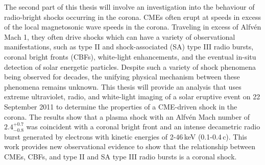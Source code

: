 \begin{abstracts}
The second part of this thesis will involve an investigation into the behaviour of radio-bright shocks occurring in the corona. CMEs often erupt at speeds in excess of the local magnetosonic wave speeds in the corona. Traveling in excess of Alfv\'{e}n Mach 1, they often drive shocks which can have a variety of observational manifestations, such as type II and {\color{black} shock-associated (SA)} type III radio bursts, coronal bright fronts (CBFs), white-light enhancements, and the eventual in-situ detection of solar energetic particles. Despite such a variety of shock phenomena being observed for decades, the unifying physical mechanism between these phenomena remains unknown. This thesis will provide an analysis that uses extreme ultraviolet, radio, and white-light imaging of a solar eruptive event on 22 September 2011 to determine the properties of a CME-driven shock in the corona. The results show that a plasma shock with an Alfv\'{e}n Mach number of $2.4^{+0.7}_{-0.8}$ was coincident with a coronal bright front and an intense decametric radio burst generated by electrons with kinetic energies of 2-46\,keV (0.1-0.4\,c). This work provides new observational evidence to show that the relationship between CMEs, CBFs, and type II and {\color{black} SA} type III radio bursts is a coronal shock. 



\end{abstracts}


